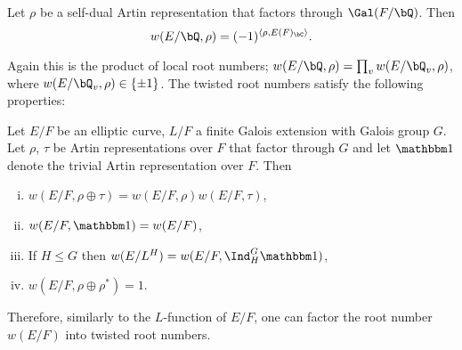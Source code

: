 \begin{conj}
   Let $\rho$ be a self-dual Artin representation that factors through $\Gal(F / \bQ)$. Then $$ w(E / \bQ, \rho) = (-1)^{\langle \rho, E(F)_{\bC} \rangle}.$$
\end{conj}

Again this is the product of local root numbers; $w(E / \bQ, \rho) = \prod_v w(E / \bQ_v, \rho)$, where $w(E / \bQ_v, \rho) \in \{ \pm 1\}$. The twisted root numbers satisfy the following properties:

\begin{prop}\cite[Lemma A.1, Proposition A.2]{reg-const}\label{compute-root-twist}
    Let $E / F$ be an elliptic curve, $L / F$ a finite Galois extension with Galois group $G$. Let $\rho$, $\tau$ be Artin representations over $F$ that factor through $G$ and let $\trivial$ denote the trivial Artin representation over $F$. Then
    \begin{enumerate}[(i)]
        \setlength\itemsep{0em}
        \item $w(E / F, \rho \oplus \tau) = w(E / F, \rho) w(E / F, \tau)$,
        \item $w(E / F, \trivial) = w(E/ F)$, 
        \item If $H \leq G$ then $w(E / L^H) = w(E/ F, \Ind_{H}^G \trivial)$, 
        \item $w(E / F, \rho \oplus \rho^*) = 1$.
    \end{enumerate}
\end{prop}

Therefore, similarly to the $L$-function of $E / F$, one can factor the root number $w(E / F)$ into twisted root numbers.
